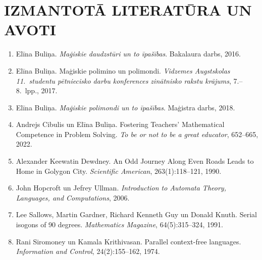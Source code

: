 \documentclass[utf8]{ludis2022}
\begin{document}
\newpage


\clearpage

\section*{IZMANTOTĀ LITERATŪRA UN AVOTI}

\begin{enumerate}
\renewcommand{\labelenumi}{[\arabic{enumi}]}

\item Elīna Buliņa.
\textit{Maģiskie daudzstūri un to īpašības}.
Bakalaura darbs, 2016.

\item Elīna Buliņa.
Maģiskie polimino un polimondi.
\textit{Vidzemes Augstskolas 11.\ studentu pētniecisko darbu konferences zinātnisko rakstu krājums},
7.--8.\ lpp., 2017.

\item Elīna Buliņa.
\textit{Maģiskie polimondi un to īpašības}.
Maģistra darbs, 2018.

\item Andrejs Cibulis un Elīna Buliņa.
Fostering Teachers’ Mathematical Competence in Problem Solving.
\textit{To be or not to be a great educator},
652--665, 2022.

\item Alexander Keewatin Dewdney.
An Odd Journey Along Even Roads Leads to Home in Golygon City.
\textit{Scientific American},
263(1):118--121, 1990.

\item John Hopcroft un Jefrey Ullman.
\textit{Introduction to Automata Theory, Languages, and Computations},
2006.

\item Lee Sallows, Martin Gardner, Richard Kenneth Guy un Donald Knuth.
Serial isogons of 90 degrees.
\textit{Mathematics Magazine},
64(5):315--324, 1991.

\item Rani Siromoney un Kamala Krithivasan.
Parallel context-free languages.
\textit{Information and Control},
24(2):155--162, 1974.

\end{enumerate}
\end{document}
